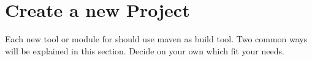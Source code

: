 \section{Create a new Project}

Each new tool or module for \thetool{} should use maven as build tool. 
Two common ways will be explained in this section. Decide on your own which fit your needs. 




